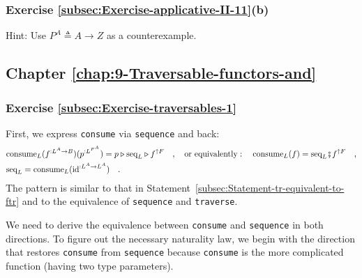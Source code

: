 \subsubsection*{Exercise \ref{subsec:Exercise-applicative-II-11}(b)}

Hint: Use $P^{A}\triangleq A\rightarrow Z$ as a counterexample.

\subsection*{Chapter \ref{chap:9-Traversable-functors-and}}

\subsubsection*{Exercise \ref{subsec:Exercise-traversables-1}}

First, we express \lstinline!consume! via \lstinline!sequence! and
back:
\begin{align}
 & \text{consume}_{L}(f^{:L^{A}\rightarrow B})(p^{:L^{F^{A}}})=p\triangleright\text{seq}_{L}\triangleright f^{\uparrow F}\quad,\quad\text{or equivalently}:\quad\text{consume}_{L}(f)=\text{seq}_{L}\bef f^{\uparrow F}\quad,\label{eq:consume-via-seq}\\
 & \text{seq}_{L}=\text{consume}_{L}(\text{id}^{:L^{A}\rightarrow L^{A}})\quad.\label{eq:seq-via-consume}
\end{align}
The pattern is similar to that in Statement~\ref{subsec:Statement-tr-equivalent-to-ftr}
and to the equivalence of \lstinline!sequence! and \lstinline!traverse!.

We need to derive the equivalence between \lstinline!consume! and
\lstinline!sequence! in both directions. To figure out the necessary
naturality law, we begin with the direction that restores \lstinline!consume!
from \lstinline!sequence! because \lstinline!consume! is the more
complicated function (having two type parameters).

